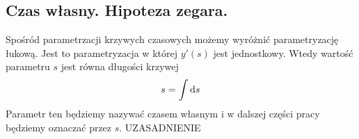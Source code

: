\subsection{Czas własny. Hipoteza zegara.}
Spośród parametrzacji krzywych czasowych
 możemy wyróżnić parametryzację łukową.
Jest to parametryzacja w której $y'(s)$ jest jednostkowy.
Wtedy wartość parametru $s$ jest równa długości krzywej
\begin{align}
s = \int \text{d} s
\end{align}
Parametr ten będziemy nazywać czasem własnym i w dalszej 
części pracy będziemy oznaczać przez $s$.
UZASADNIENIE
